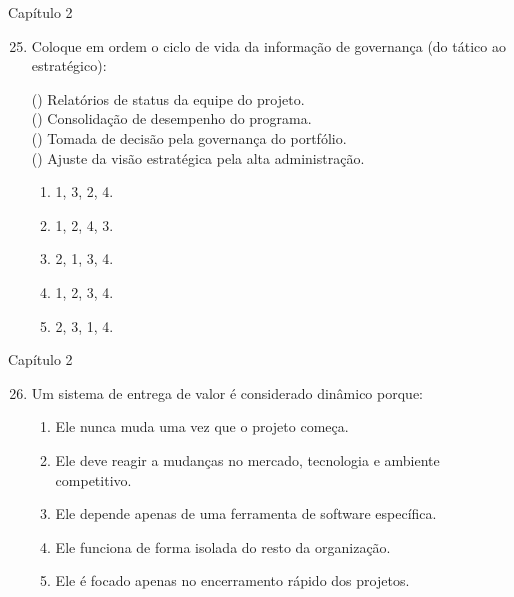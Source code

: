 \documentclass{beamer}
\begin{document}
\begin{frame}{Capítulo 2}
	\begin{enumerate}
		\setcounter{enumi}{24}
		\justifying
		\item Coloque em ordem o ciclo de vida da informação de governança (do tático ao estratégico):
		
		(\hspace{10pt}) Relatórios de status da equipe do projeto.\\
		(\hspace{10pt}) Consolidação de desempenho do programa.\\
		(\hspace{10pt}) Tomada de decisão pela governança do portfólio.\\
		(\hspace{10pt}) Ajuste da visão estratégica pela alta administração.
		
		\vspace{10pt}
		\begin{enumerate}[a]
			\item 1, 3, 2, 4.
			\item 1, 2, 4, 3.
			\item 2, 1, 3, 4.
			\item \alert<2>{1, 2, 3, 4}.
			\item 2, 3, 1, 4.
		\end{enumerate}
	\end{enumerate}
\end{frame}

\begin{frame}{Capítulo 2}
	\begin{enumerate}
		\setcounter{enumi}{25}
		\justifying
		\item Um sistema de entrega de valor é considerado dinâmico porque:
		\begin{enumerate}[a]
			\justifying
			\item Ele nunca muda uma vez que o projeto começa.
			\item \alert<2>{Ele deve reagir a mudanças no mercado, tecnologia e ambiente competitivo}.
			\item Ele depende apenas de uma ferramenta de software específica.
			\item Ele funciona de forma isolada do resto da organização.
			\item Ele é focado apenas no encerramento rápido dos projetos.
		\end{enumerate}
	\end{enumerate}
\end{frame}
\end{document}
